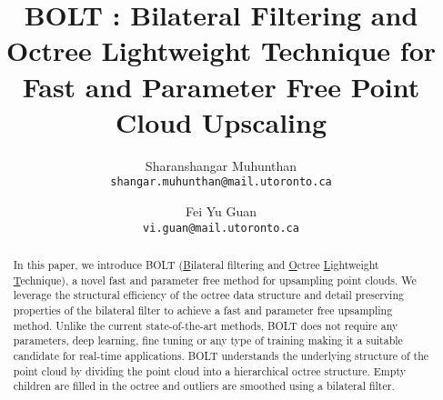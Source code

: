 \documentclass[fleqn]{article}
\author{
	Sharanshangar Muhunthan \\ \texttt{shangar.muhunthan@mail.utoronto.ca}
	\and
	Fei Yu Guan \\ \texttt{vi.guan@mail.utoronto.ca}
}
\title{BOLT \emoji{high-voltage}: Bilateral Filtering and Octree Lightweight Technique for Fast and Parameter Free Point Cloud Upscaling}
\begin{document}
\maketitle
\begin{abstract}
	In this paper, we introduce BOLT (\underline{B}ilateral filtering and \underline{O}ctree \underline{L}ightweight \underline{T}echnique), a novel fast and parameter free method for upsampling point clouds.
	We leverage the structural efficiency of the octree data structure and detail preserving properties of the bilateral filter to achieve a fast and parameter free upsampling method.
	Unlike the current state-of-the-art methods, BOLT does not require any parameters, deep learning, fine tuning or any type of training making it a suitable candidate for real-time applications.
	BOLT understands the underlying structure of the point cloud by dividing the point cloud into a hierarchical octree structure. 
	Empty children are filled in the octree and outliers are smoothed using a bilateral filter.
\end{abstract}
\end{document}
